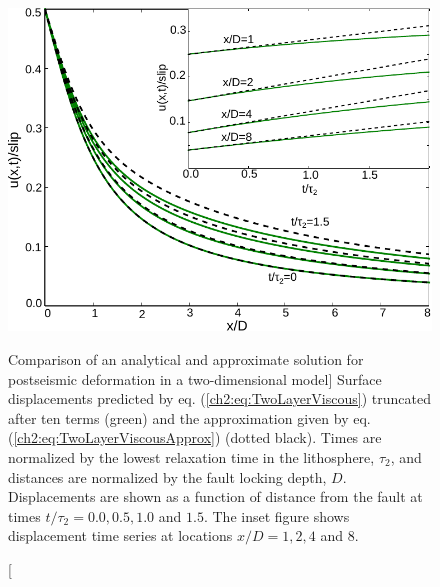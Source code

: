 \begin{figure}
\includegraphics{ch2/figures/Fig1.pdf}
\caption
[Comparison of an analytical and approximate solution for postseismic
deformation in a two-dimensional model]
{Surface displacements predicted by eq. (\ref{ch2:eq:TwoLayerViscous})
truncated after ten terms (green) and the approximation given by eq.
(\ref{ch2:eq:TwoLayerViscousApprox}) (dotted black).  Times are
normalized by the lowest relaxation time in the lithosphere, $\tau_2$,
and distances are normalized by the fault locking depth, $D$.
Displacements are shown as a function of distance from the fault at
times $t/\tau_2 = 0.0,0.5,1.0$ and $1.5$. The inset figure shows
displacement time series at locations $x/D = 1, 2, 4$ and $8$.}
\label{ch2:fig:1}
\end{figure} 


